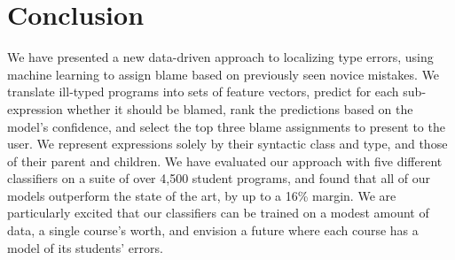 \section{Conclusion}
\label{sec:conclusion}

We have presented a new data-driven approach to localizing type errors,
using machine learning to assign blame based on previously seen novice
mistakes.
%
We translate ill-typed programs into sets of feature vectors, predict
for each sub-expression whether it should be blamed, rank the
predictions based on the model's confidence, and select the top three
blame assignments to present to the user.
%
We represent expressions solely by their syntactic class and type, and
those of their parent and children.
%
We have evaluated our approach with five different classifiers
on a suite of over 4,500 student programs, and found that all of our
models outperform the state of the art, by up to a 16\% margin.
%
We are particularly excited that our classifiers can be trained on a
modest amount of data, \eg a single course's worth, and envision a
future where each course has a model of its students' errors.





